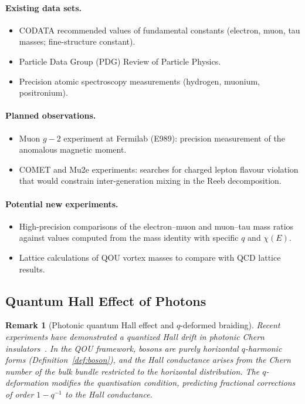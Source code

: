 \documentclass[12pt,a4paper]{report}
\newtheorem{remark}[theorem]{Remark}
\begin{document}
\paragraph{Existing data sets.}
\begin{itemize}
  \item CODATA recommended values of fundamental constants (electron, muon,
        tau masses; fine-structure constant).
  \item Particle Data Group (PDG) Review of Particle Physics.
  \item Precision atomic spectroscopy measurements (hydrogen, muonium,
        positronium).
\end{itemize}

\paragraph{Planned observations.}
\begin{itemize}
  \item Muon $g-2$ experiment at Fermilab (E989): precision measurement of
        the anomalous magnetic moment.
  \item COMET and Mu2e experiments: searches for charged lepton flavour
        violation that would constrain inter-generation mixing in the Reeb
        decomposition.
\end{itemize}

\paragraph{Potential new experiments.}
\begin{itemize}
  \item High-precision comparisons of the electron--muon and muon--tau mass
        ratios against values computed from the mass identity with specific
        $q$ and $\chi(E)$.
  \item Lattice calculations of QOU vortex masses to compare with QCD
        lattice results.
\end{itemize}

\subsection{Quantum Hall Effect of Photons}
\label{sec:quantum-hall-photons}

\begin{remark}[Photonic quantum Hall effect and $q$-deformed braiding]
\label{rem:photonic-hall}
Recent experiments have demonstrated a quantized Hall drift in photonic Chern
insulators~\cite{chenier2026}.  In the QOU framework, bosons are purely
horizontal $q$-harmonic forms (Definition~\ref{def:boson}), and the Hall
conductance arises from the Chern number of the bulk bundle restricted to the
horizontal distribution.  The $q$-deformation modifies the quantisation
condition, predicting fractional corrections of order $1 - q^{-1}$ to the Hall
conductance.
\end{remark}
\end{document}
